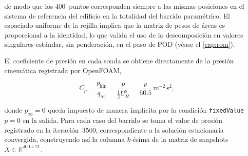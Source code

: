 de modo que los 400~puntos corresponden siempre a las mismas posiciones en el sistema de referencia del edificio en la totalidad del barrido paramétrico. El espaciado uniforme de la rejilla implica que la matriz de pesos de áreas es proporcional a la identidad, lo que valida el uso de la descomposición en valores singulares estándar, sin ponderación, en el paso de POD (véase el \autoref{cap:rom}).

El coeficiente de presión en cada sonda se obtiene directamente de la presión cinemática registrada por OpenFOAM,

\begin{equation}
    C_p = \frac{p_{\mathrm{kin}}}{q_{\mathrm{ref}}} = \frac{p}{\tfrac{1}{2}U_H^2} = \frac{p}{60.5}\,\mathrm{m^{-2}\,s^{2}},
    \label{eq:cp_probes}
\end{equation}

donde $p_\infty = 0$ queda impuesto de manera implícita por la condición \texttt{fixedValue}~$p = 0$ en la salida. Para cada caso del barrido se toma el valor de presión registrado en la iteración~3500, correspondiente a la solución estacionaria convergida, construyendo así la columna $k$-ésima de la matriz de snapshots $X \in \mathbb{R}^{400 \times 21}$.
